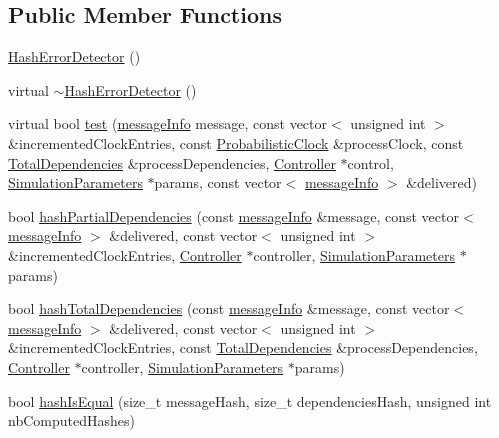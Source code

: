 \subsection*{Public Member Functions}
\begin{DoxyCompactItemize}
\item 
\hyperlink{classHashErrorDetector_a008bd7bd3f8d202334afd51a71cbbdae}{Hash\+Error\+Detector} ()
\item 
virtual \hyperlink{classHashErrorDetector_a187ba4d9f902ecaa0ff8b92ec531d3f4}{$\sim$\+Hash\+Error\+Detector} ()
\item 
virtual bool \hyperlink{classHashErrorDetector_a1c7fe649a34cf7e139ce53a248dce748}{test} (\hyperlink{structures_8h_a7e7bdc1d2fff8a9436f2f352b2711ed6}{message\+Info} message, const vector$<$ unsigned int $>$ \&incremented\+Clock\+Entries, const \hyperlink{classProbabilisticClock}{Probabilistic\+Clock} \&process\+Clock, const \hyperlink{classTotalDependencies}{Total\+Dependencies} \&process\+Dependencies, \hyperlink{classController}{Controller} $\ast$control, \hyperlink{classSimulationParameters}{Simulation\+Parameters} $\ast$params, const vector$<$ \hyperlink{structures_8h_a7e7bdc1d2fff8a9436f2f352b2711ed6}{message\+Info} $>$ \&delivered)
\item 
bool \hyperlink{classHashErrorDetector_a851c562e49f608ec3fe3e984db27bfca}{hash\+Partial\+Dependencies} (const \hyperlink{structures_8h_a7e7bdc1d2fff8a9436f2f352b2711ed6}{message\+Info} \&message, const vector$<$ \hyperlink{structures_8h_a7e7bdc1d2fff8a9436f2f352b2711ed6}{message\+Info} $>$ \&delivered, const vector$<$ unsigned int $>$ \&incremented\+Clock\+Entries, \hyperlink{classController}{Controller} $\ast$controller, \hyperlink{classSimulationParameters}{Simulation\+Parameters} $\ast$params)
\item 
bool \hyperlink{classHashErrorDetector_a13dd5fae3ca4898bd91d1801beed24a4}{hash\+Total\+Dependencies} (const \hyperlink{structures_8h_a7e7bdc1d2fff8a9436f2f352b2711ed6}{message\+Info} \&message, const vector$<$ \hyperlink{structures_8h_a7e7bdc1d2fff8a9436f2f352b2711ed6}{message\+Info} $>$ \&delivered, const vector$<$ unsigned int $>$ \&incremented\+Clock\+Entries, const \hyperlink{classTotalDependencies}{Total\+Dependencies} \&process\+Dependencies, \hyperlink{classController}{Controller} $\ast$controller, \hyperlink{classSimulationParameters}{Simulation\+Parameters} $\ast$params)
\item 
bool \hyperlink{classHashErrorDetector_a93b22ebde71c18f801319b33ce30899c}{hash\+Is\+Equal} (size\+\_\+t message\+Hash, size\+\_\+t dependencies\+Hash, unsigned int nb\+Computed\+Hashes)

\end{DoxyCompactItemize}
